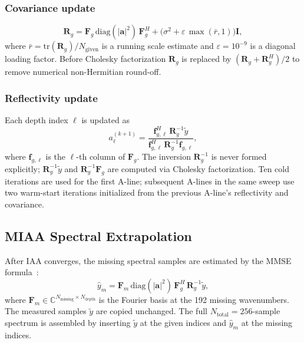 \documentclass[conference]{IEEEtran}
\begin{document}
\subsubsection*{Covariance update}
\begin{equation}
  \mathbf{R}_g = \mathbf{F}_g\,\mathrm{diag}(|\mathbf{a}|^2)\,\mathbf{F}_g^H
  + \bigl(\sigma^2 + \varepsilon\,\max(\bar{r},1)\bigr)\mathbf{I},
  \label{eq:cov}
\end{equation}
where $\bar{r} = \mathrm{tr}(\mathbf{R}_g)/N_\text{given}$ is a
running scale estimate and $\varepsilon = 10^{-9}$ is a diagonal
loading factor. Before Cholesky factorization $\mathbf{R}_g$ is
replaced by $(\mathbf{R}_g + \mathbf{R}_g^H)/2$ to remove numerical
non-Hermitian round-off.

\subsubsection*{Reflectivity update}

Each depth index $\ell$ is updated as
\begin{equation}
  a_\ell^{(k+1)}
  = \frac{\mathbf{f}_{g,\ell}^H\,\mathbf{R}_g^{-1}\tilde{y}}
         {\mathbf{f}_{g,\ell}^H\,\mathbf{R}_g^{-1}\mathbf{f}_{g,\ell}},
  \label{eq:iaa_update}
\end{equation}
where $\mathbf{f}_{g,\ell}$ is the $\ell$-th column of
$\mathbf{F}_g$. The inversion $\mathbf{R}_g^{-1}$ is never formed
explicitly; $\mathbf{R}_g^{-1}\tilde{y}$ and
$\mathbf{R}_g^{-1}\mathbf{F}_g$ are computed via Cholesky
factorization. Ten cold iterations are used for the first A-line;
subsequent A-lines in the same sweep use two warm-start iterations
initialized from the previous A-line's reflectivity and covariance.

\subsection{MIAA Spectral Extrapolation}

After IAA converges, the missing spectral samples are estimated by the
MMSE formula~\cite{stoica2009missing}:
\begin{equation}
  \hat{y}_m
  = \mathbf{F}_m\,\mathrm{diag}(|\mathbf{a}|^2)\,
    \mathbf{F}_g^H\,\mathbf{R}_g^{-1}\tilde{y},
  \label{eq:miaa}
\end{equation}
where $\mathbf{F}_m\in\mathbb{C}^{N_\text{missing}\times N_\text{depth}}$
is the Fourier basis at the 192 missing wavenumbers. The measured
samples $\tilde{y}$ are copied unchanged. The full $N_\text{total}
= 256$-sample spectrum is assembled by inserting $\tilde{y}$ at the
given indices and $\hat{y}_m$ at the missing indices.
\end{document}
